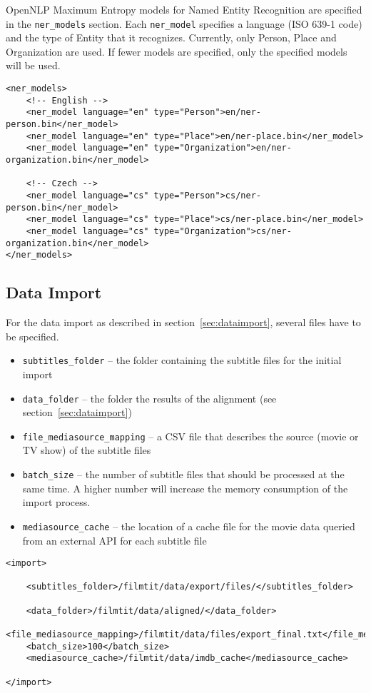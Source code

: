 OpenNLP Maximum Entropy models for Named Entity Recognition are specified in the \verb#ner_models# section. Each \verb#ner_model# specifies a language (ISO 639-1 code) and the type of Entity that it recognizes. Currently, only Person, Place and Organization are used. If fewer models are specified, only the specified models will be used.

\begin{lstlisting}
<ner_models>
    <!-- English -->
    <ner_model language="en" type="Person">en/ner-person.bin</ner_model>
    <ner_model language="en" type="Place">en/ner-place.bin</ner_model>
    <ner_model language="en" type="Organization">en/ner-organization.bin</ner_model>

    <!-- Czech -->
    <ner_model language="cs" type="Person">cs/ner-person.bin</ner_model>
    <ner_model language="cs" type="Place">cs/ner-place.bin</ner_model>
    <ner_model language="cs" type="Organization">cs/ner-organization.bin</ner_model>
</ner_models>
\end{lstlisting}

\subsection{Data Import}
For the data import as described in section~\ref{sec:dataimport}, several files have to be specified.

\begin{itemize}
        \item \verb#subtitles_folder# -- the folder containing the subtitle files for the initial import
        \item \verb#data_folder# -- the folder the results of the alignment (see section~\ref{sec:dataimport})
        \item \verb#file_mediasource_mapping# -- a CSV file that describes the source (movie or TV show) of the  subtitle files
        \item \verb#batch_size# -- the number of subtitle files that should be processed at the same time. A higher number will increase the memory consumption of the import process.
        \item \verb#mediasource_cache# -- the location of a cache file for the movie data queried from an external API for each subtitle file
        
\end{itemize}


\begin{lstlisting}
<import>

    <subtitles_folder>/filmtit/data/export/files/</subtitles_folder>

    <data_folder>/filmtit/data/aligned/</data_folder>
    <file_mediasource_mapping>/filmtit/data/files/export_final.txt</file_mediasource_mapping>
    <batch_size>100</batch_size>
    <mediasource_cache>/filmtit/data/imdb_cache</mediasource_cache>

</import>
\end{lstlisting}



